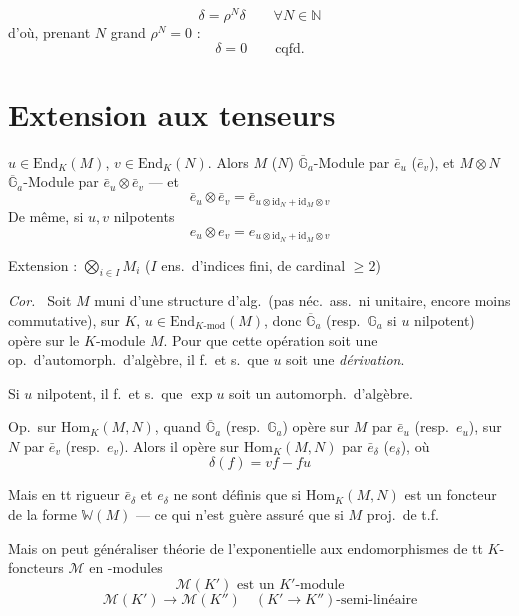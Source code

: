 \documentclass[11pt,a4paper]{article}
\begin{document}

\[
\delta = \rho^N \delta \qquad \forall N \in \mathbb{N}
\]
d'où, prenant $N$ grand  $\rho^N = 0$ :
\[
\delta = 0 \qquad \text{cqfd.}
\]

\section*{Extension aux tenseurs}

$u \in \mathrm{End}_K(M)$, $v \in \mathrm{End}_K(N)$. Alors $M$ ($N$)
$\overline{\mathbb{G}}_a$-Module par $\bar e_u$ ($\bar e_v$), et $M \otimes N$
$\overline{\mathbb{G}}_a$-Module par $\bar e_u \otimes \bar e_v$ — et
\[
\bar e_u \otimes \bar e_v = \bar e_{u \otimes \mathrm{id}_N + \mathrm{id}_M \otimes v}
\]
De même, si $u, v$ nilpotents
\[
e_u \otimes e_v = e_{u \otimes \mathrm{id}_N + \mathrm{id}_M \otimes v}
\]

Extension : $\bigotimes_{i \in I} M_i$ ($I$ ens.\ d'indices fini, de cardinal
$\geq 2$)

\emph{Cor.\ } Soit $M$ muni d'une structure d'alg.\ (pas
néc.\ ass.\ ni unitaire, encore moins commutative), sur $K$,
$u \in \mathrm{End}_{K\text{-mod}}(M)$, donc $\overline{\mathbb{G}}_a$ (resp.\
$\mathbb{G}_a$ si $u$ nilpotent) opère sur le $K$-module $M$. Pour que cette
opération soit une op.\ d'automorph.\ d'algèbre, il f.\ et s.\ que $u$ soit une
\emph{dérivation}.

Si $u$ nilpotent, il f.\ et s.\ que $\exp u$ soit un automorph.\ d'algèbre.

Op.\ sur $\mathrm{Hom}_K(M, N)$, quand $\overline{\mathbb{G}}_a$ (resp.\
$\mathbb{G}_a$) opère sur $M$ par $\bar e_u$ (resp.\ $e_u$), sur $N$ par
$\bar e_v$ (resp.\ $e_v$). Alors il opère sur $\mathrm{Hom}_K(M, N)$ par
$\bar e_\delta$ ($e_\delta$), où
\[
\delta(f) = vf - fu
\]

Mais en tt rigueur $\bar e_\delta$ et $e_\delta$ ne sont définis \ill{} que si
$\mathrm{Hom}_K(M, N)$ est  un foncteur de la forme
$\mathbb{W}(M)$ — ce qui n'est guère assuré que si $M$ proj.\ de t.f.

Mais on peut généraliser théorie de l'exponentielle 
aux endomorphismes de tt $K$-foncteurs $\mathcal{M}$ en
\uncertain{$\mathbb{Q}$}-modules
\[
\mathcal{M}(K') \text{ est un } K'\text{-module}
\]
\[
\mathcal{M}(K') \to \mathcal{M}(K'') \quad (K' \to K'')\text{-semi-linéaire}
\]
\end{document}
